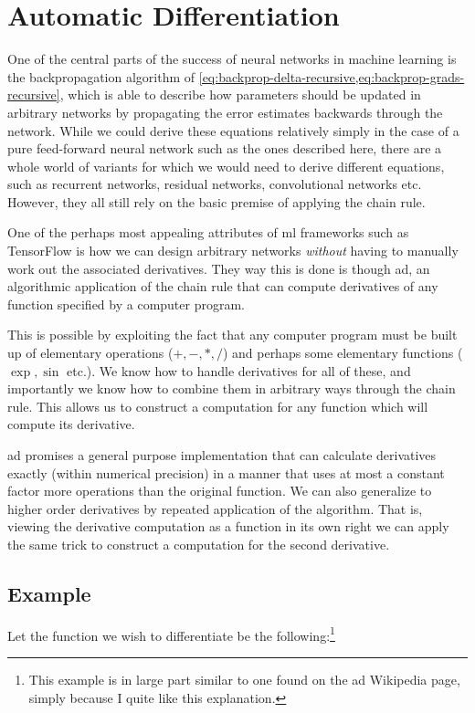 \documentclass[Thesis.tex]{subfiles}
\begin{document}
\chapter{Automatic Differentiation}
\label{chp:auto-diff}

One of the central parts of the success of neural networks in machine learning
is the backpropagation algorithm of
\cref{eq:backprop-delta-recursive,eq:backprop-grads-recursive}, which is able to
describe how parameters should be updated in arbitrary networks by propagating
the error estimates backwards through the network. While we could derive these
equations relatively simply in the case of a pure feed-forward neural network
such as the ones described here, there are a whole world of variants for which
we would need to derive different equations, such as recurrent networks,
residual networks, convolutional networks etc. However, they all still rely on the basic
premise of applying the chain rule.

One of the perhaps most appealing attributes of \gls{ml} frameworks such as TensorFlow
is how we can design arbitrary networks \emph{without} having to manually work
out the associated derivatives. They way this is done is though \gls{ad}, an
algorithmic application of the chain rule that can compute derivatives of any
function specified by a computer program.

This is possible by exploiting the fact that any computer program must be built
up of elementary operations (\(+,-,*,/\)) and perhaps some elementary functions
(\(\exp, \sin\) etc.). We know how to handle derivatives for all of these, and
importantly we know how to combine them in arbitrary ways through the chain
rule. This allows us to construct a computation for any function which
will compute its derivative.

\Gls{ad} promises a general purpose implementation that can
calculate derivatives exactly (within numerical precision) in a manner that uses
at most a constant factor more operations than the original function. We can
also generalize to higher order derivatives by repeated application of the
algorithm. That is, viewing the derivative computation as a function in its own
right we can apply the same trick to construct a computation for the second
derivative.


\section{Example}

Let the function we wish to differentiate be the following:\footnote{This example is in large part similar to one found
    on the \gls{ad} Wikipedia page, simply because I quite like this explanation.}
\end{document}
